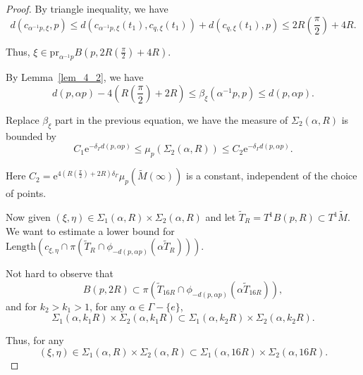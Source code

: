 \documentclass[reqno,11pt]{article}
\theoremstyle{definition}
\theoremstyle{remark}
\numberwithin{equation}{section}
\begin{document}
\begin{proof}
    By triangle inequality, we have 
    \begin{displaymath}
       d(c_{\alpha^{-1}p,\xi},p)\leq             d(c_{\alpha^{-1}p,\xi}(t_1),c_{q,\xi}(t_1))+d(c_{q,\xi}(t_1),p)\leq 2R(\frac{\pi}{2})+4R.
    \end{displaymath}


 Thus, $\xi\in\text{pr}_{\alpha^{-1}p}B(p,2R(\frac{\pi}{2})+4R)$.

	By Lemma~\ref{lem_4_2}, we have
	\begin{displaymath}
        d(p,\alpha p)-4(R(\frac{\pi}{2})+2R)\leq\beta_\xi(\alpha^{-1}p,p)\leq d(p,\alpha p).
	\end{displaymath}

	Replace $\beta_\xi$ part in the previous equation, we have the measure of $\Sigma_2(\alpha,R)$ is bounded by
	\begin{equation}\label{equ_6_3}
		C_1\mathrm{e}^{-\delta_\Gamma d(p,\alpha p)}\leq\mu_p(\Sigma_2(\alpha,R))\leq C_2\mathrm{e}^{-\delta_\Gamma d(p,\alpha p)}.
	\end{equation}

    Here $C_2=\mathrm{e}^{4(R(\frac{\pi}{2})+2R)\delta_\Gamma}\mu_p(\widetilde{M}(\infty))$ is a constant, independent of the choice of points.

    Now given $(\xi,\eta)\in\Sigma_1(\alpha,R)\times\Sigma_2(\alpha,R)$ and let $\widetilde{T}_R=T^1B(p,R)\subset T^1\widetilde{M}$. We want to estimate a lower bound for $\text{Length}(c_{\xi,\eta}\cap\pi(\widetilde{T}_R\cap\phi_{-d(p,\alpha p)}(\alpha\widetilde{T}_R)))$.

	Not hard to observe that
	\begin{displaymath}
		B(p,2R)\subset\pi(\widetilde{T}_{16R}\cap\phi_{-d(p,\alpha p)}(\alpha\widetilde{T}_{16R})),
	\end{displaymath}
	and for $k_2>k_1>1$, for any $\alpha\in\Gamma-\{e\}$,
	\begin{equation}\label{equ_6_4}
		\Sigma_1(\alpha,k_1R)\times\Sigma_2(\alpha,k_1R)\subset\Sigma_1(\alpha,k_2R)\times\Sigma_2(\alpha,k_2R).
	\end{equation}

	Thus, for any
	\begin{displaymath}
		(\xi,\eta)\in\Sigma_1(\alpha,R)\times\Sigma_2(\alpha,R)\subset\Sigma_1(\alpha,16R)\times\Sigma_2(\alpha,16R).
	\end{displaymath}


\end{proof}
\end{document}
